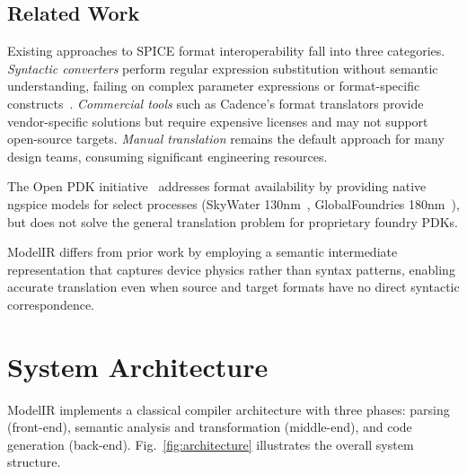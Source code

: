 \documentclass[conference]{IEEEtran}
\begin{document}
\subsection{Related Work}

Existing approaches to SPICE format interoperability fall into three categories. \textit{Syntactic converters} perform regular expression substitution without semantic understanding, failing on complex parameter expressions or format-specific constructs~\cite{netlist_convert}. \textit{Commercial tools} such as Cadence's format translators provide vendor-specific solutions but require expensive licenses and may not support open-source targets. \textit{Manual translation} remains the default approach for many design teams, consuming significant engineering resources.

The Open PDK initiative~\cite{openpdk} addresses format availability by providing native ngspice models for select processes (SkyWater 130nm~\cite{skywater}, GlobalFoundries 180nm~\cite{gf180}), but does not solve the general translation problem for proprietary foundry PDKs.

ModelIR differs from prior work by employing a semantic intermediate representation that captures device physics rather than syntax patterns, enabling accurate translation even when source and target formats have no direct syntactic correspondence.

\section{System Architecture}
\label{sec:architecture}

ModelIR implements a classical compiler architecture with three phases: parsing (front-end), semantic analysis and transformation (middle-end), and code generation (back-end). Fig.~\ref{fig:architecture} illustrates the overall system structure.
\end{document}
